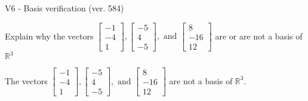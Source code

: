 \begin{exercise}
  \begin{exerciseTitle}V6 - Basis verification (ver. 584)\end{exerciseTitle}
  \begin{exerciseStatement}
    Explain why the vectors \(\left[\begin{array}{r}
-1 \\
-4 \\
1
\end{array}\right] , \left[\begin{array}{r}
-5 \\
4 \\
-5
\end{array}\right] , \text{ and } \left[\begin{array}{r}
8 \\
-16 \\
12
\end{array}\right]\) are or are not a basis of \(\mathbb{R}^3\)	


  \end{exerciseStatement}
  \begin{exerciseAnswer}
   The vectors \(\left[\begin{array}{r}
-1 \\
-4 \\
1
\end{array}\right] , \left[\begin{array}{r}
-5 \\
4 \\
-5
\end{array}\right] , \text{ and } \left[\begin{array}{r}
8 \\
-16 \\
12
\end{array}\right]\) 
  	 are not  a basis of \(\mathbb{R}^3\).
  


  \end{exerciseAnswer}
\end{exercise}